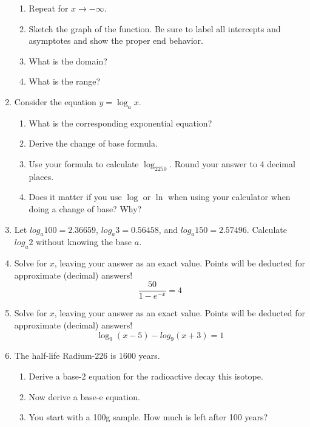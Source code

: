 \documentclass[letterpaper,12pt,fleqn]{article}
\begin{document}
\begin{enumerate}
\begin{enumerate}
\item Repeat for $x\to-\infty$.

\item Sketch the graph of the function.  Be sure to label all intercepts and
asymptotes and show the proper end behavior.

\item What is the domain?

\item What is the range?
\end{enumerate}

\item Consider the equation $y=\log_ax$.
\begin{enumerate}
\item What is the corresponding exponential equation?

\item Derive the change of base formula.

\item Use your formula to calculate $\log_2250$.  Round your answer to 4
decimal places.

\item Does it matter if you use $\log$ or $\ln$ when using your calculator when
doing a change of base?  Why?
\end{enumerate}

\item Let $log_a100=2.36659$, $log_a3=0.56458$, and $log_a150=2.57496$.
Calculate $log_a2$ without knowing the base $a$.

\item Solve for $x$, leaving your answer as an exact value.  Points will be
deducted for approximate (decimal) answers!
\[\frac{50}{1-e^{-x}}=4\]

\item Solve for $x$, leaving your answer as an exact value.  Points will be
deducted for approximate (decimal) answers!
\[\log_9(x-5)-log_9(x+3)=1\]

\item The half-life Radium-226 is 1600 years.

\begin{enumerate}

\item Derive a base-2 equation for the radioactive decay this isotope.

\item Now derive a base-e equation.

\item You start with a 100g sample.  How much is left after 100 years?


\end{enumerate}
\end{enumerate}
\end{document}
